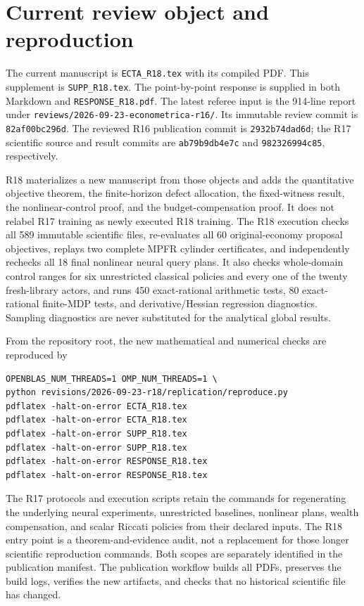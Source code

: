 \section{Current review object and reproduction}\label{supp:r18entry}
The current manuscript is \texttt{ECTA\_R18.tex} with its compiled PDF. This supplement is \texttt{SUPP\_R18.tex}. The point-by-point response is supplied in both Markdown and \texttt{RESPONSE\_R18.pdf}. The latest referee input is the 914-line report under \texttt{reviews/2026-09-23-econometrica-r16/}. Its immutable review commit is \texttt{82af00bc296d}. The reviewed R16 publication commit is \texttt{2932b74dad6d}; the R17 scientific source and result commits are \texttt{ab79b9db4e7c} and \texttt{982326994c85}, respectively.

R18 materializes a new manuscript from those objects and adds the quantitative objective theorem, the finite-horizon defect allocation, the fixed-witness result, the nonlinear-control proof, and the budget-compensation proof. It does not relabel R17 training as newly executed R18 training. The R18 execution checks all 589 immutable scientific files, re-evaluates all 60 original-economy proposal objectives, replays two complete MPFR cylinder certificates, and independently rechecks all 18 final nonlinear neural query plans. It also checks whole-domain control ranges for six unrestricted classical policies and every one of the twenty fresh-library actors, and runs 450 exact-rational arithmetic tests, 80 exact-rational finite-MDP tests, and derivative/Hessian regression diagnostics. Sampling diagnostics are never substituted for the analytical global results.

From the repository root, the new mathematical and numerical checks are reproduced by
\begin{verbatim}
OPENBLAS_NUM_THREADS=1 OMP_NUM_THREADS=1 \
python revisions/2026-09-23-r18/replication/reproduce.py
pdflatex -halt-on-error ECTA_R18.tex
pdflatex -halt-on-error ECTA_R18.tex
pdflatex -halt-on-error SUPP_R18.tex
pdflatex -halt-on-error SUPP_R18.tex
pdflatex -halt-on-error RESPONSE_R18.tex
pdflatex -halt-on-error RESPONSE_R18.tex
\end{verbatim}
The R17 protocols and execution scripts retain the commands for regenerating the underlying neural experiments, unrestricted baselines, nonlinear plans, wealth compensation, and scalar Riccati policies from their declared inputs. The R18 entry point is a theorem-and-evidence audit, not a replacement for those longer scientific reproduction commands. Both scopes are separately identified in the publication manifest. The publication workflow builds all PDFs, preserves the build logs, verifies the new artifacts, and checks that no historical scientific file has changed.

